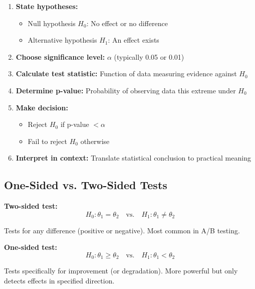 \begin{enumerate}
    \item \textbf{State hypotheses:}
    \begin{itemize}
        \item Null hypothesis $H_0$: No effect or no difference
        \item Alternative hypothesis $H_1$: An effect exists
    \end{itemize}

    \item \textbf{Choose significance level:} $\alpha$ (typically 0.05 or 0.01)

    \item \textbf{Calculate test statistic:} Function of data measuring evidence against $H_0$

    \item \textbf{Determine p-value:} Probability of observing data this extreme under $H_0$

    \item \textbf{Make decision:}
    \begin{itemize}
        \item Reject $H_0$ if p-value $< \alpha$
        \item Fail to reject $H_0$ otherwise
    \end{itemize}

    \item \textbf{Interpret in context:} Translate statistical conclusion to practical meaning
\end{enumerate}

\subsection{One-Sided vs. Two-Sided Tests}

\textbf{Two-sided test:}
\begin{equation}
H_0: \theta_1 = \theta_2 \quad \text{vs.} \quad H_1: \theta_1 \neq \theta_2
\end{equation}

Tests for any difference (positive or negative). Most common in A/B testing.

\textbf{One-sided test:}
\begin{equation}
H_0: \theta_1 \geq \theta_2 \quad \text{vs.} \quad H_1: \theta_1 < \theta_2
\end{equation}

Tests specifically for improvement (or degradation). More powerful but only detects effects in specified direction.

